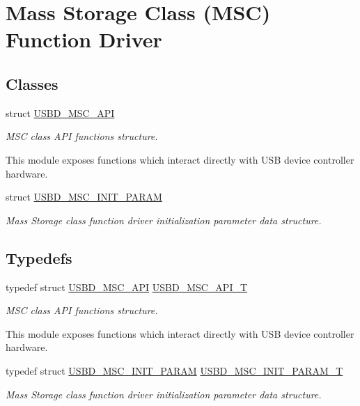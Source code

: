 \hypertarget{group__USBD__MSC}{}\section{Mass Storage Class (M\+SC) Function Driver}
\label{group__USBD__MSC}
\subsection*{Classes}
\begin{DoxyCompactItemize}
\item 
struct \hyperlink{structUSBD__MSC__API}{U\+S\+B\+D\+\_\+\+M\+S\+C\+\_\+\+A\+PI}
\begin{DoxyCompactList}\small\item\em M\+SC class A\+PI functions structure.

This module exposes functions which interact directly with U\+SB device controller hardware. \end{DoxyCompactList}\item 
struct \hyperlink{structUSBD__MSC__INIT__PARAM}{U\+S\+B\+D\+\_\+\+M\+S\+C\+\_\+\+I\+N\+I\+T\+\_\+\+P\+A\+R\+AM}
\begin{DoxyCompactList}\small\item\em Mass Storage class function driver initialization parameter data structure. \end{DoxyCompactList}\end{DoxyCompactItemize}
\subsection*{Typedefs}
\begin{DoxyCompactItemize}
\item 
typedef struct \hyperlink{structUSBD__MSC__API}{U\+S\+B\+D\+\_\+\+M\+S\+C\+\_\+\+A\+PI} \hyperlink{group__USBD__MSC_ga521bb0e0edf4060aeb10827c6c29f7cf}{U\+S\+B\+D\+\_\+\+M\+S\+C\+\_\+\+A\+P\+I\+\_\+T}
\begin{DoxyCompactList}\small\item\em M\+SC class A\+PI functions structure.

This module exposes functions which interact directly with U\+SB device controller hardware. \end{DoxyCompactList}\item 
typedef struct \hyperlink{structUSBD__MSC__INIT__PARAM}{U\+S\+B\+D\+\_\+\+M\+S\+C\+\_\+\+I\+N\+I\+T\+\_\+\+P\+A\+R\+AM} \hyperlink{group__USBD__MSC_ga01cbe726c0ee97ee44661ca88d7e8fbd}{U\+S\+B\+D\+\_\+\+M\+S\+C\+\_\+\+I\+N\+I\+T\+\_\+\+P\+A\+R\+A\+M\+\_\+T}
\begin{DoxyCompactList}\small\item\em Mass Storage class function driver initialization parameter data structure. \end{DoxyCompactList}\end{DoxyCompactItemize}


